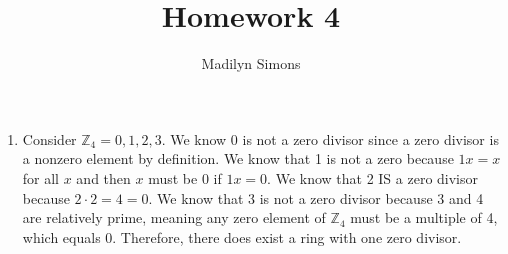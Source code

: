 \documentclass{article}
\title{Homework 4}
\author{Madilyn Simons}
\date{}
\begin{document}
\maketitle

\begin{enumerate}

\item Consider ${\mathbb{Z}}_4 = {0, 1, 2, 3}$.  We know 0 is not a zero divisor since
a zero divisor is a nonzero element by definition.  We know that 1 is not a zero
because $1x = x$ for all $x$  and then $x$ must be 0 if $1x = 0$.  We know that
2 IS a zero divisor because $2\cdot2 = 4 = 0$.  We know that 3 is not a zero
divisor because 3 and 4 are relatively prime, meaning any zero element of
${\mathbb{Z}}_4$ must be a multiple of 4, which equals 0.  Therefore, there
does exist a ring with one zero divisor.


\end{enumerate}
\end{document}
